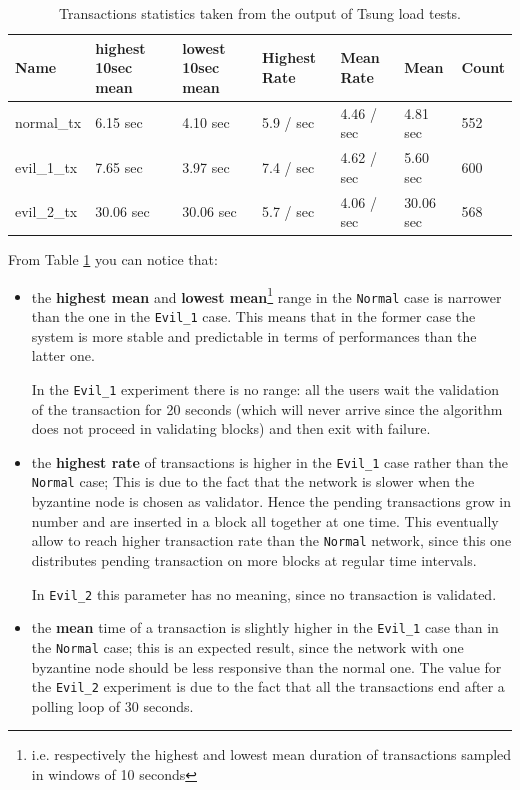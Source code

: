 \documentclass[]{article}
\begin{document}
\begin{table}[!htb]
\centering
\begin{tabular}{| l | l | l | l | l | l | l |}
	 \hline
	Name  & highest 10sec mean  & lowest 10sec mean & Highest Rate & Mean Rate & Mean  & Count \\
	 \hline
	 normal\_tx  & 6.15 sec & 4.10 sec & 5.9 / sec & 4.46 / sec & 4.81 sec & 552 \\	
	 \hline
	 evil\_1\_tx  & 7.65 sec & 3.97 sec & 7.4 / sec & 4.62 / sec & 5.60 sec & 600  \\
	 \hline
	 evil\_2\_tx  & 30.06 sec & 30.06 sec & 5.7 / sec & 4.06 / sec & 30.06 sec & 568  \\
	 \hline

\end{tabular}
\caption{\label{bench-main} Transactions statistics taken from the output of Tsung load tests.}
\end{table}
From Table \ref{bench-main} you can notice that:
\begin{itemize}
	\item the \textbf{highest mean} and \textbf{lowest mean}\footnote{i.e. respectively the highest and lowest mean duration of transactions sampled in windows of 10 seconds} range in the \texttt{Normal} case is narrower than the one in the \texttt{Evil\_1} case. This means that in the former case the system is more stable and predictable in terms of performances than the latter one.
	
	In the \texttt{Evil\_1} experiment there is no range: all the users wait the validation of the transaction for 20 seconds (which will never arrive since the algorithm does not proceed in validating blocks) and then exit with failure.
	\item the \textbf{highest rate} of transactions is higher in the \texttt{Evil\_1} case rather than the \texttt{Normal} case; This is due to the fact that the network is slower when the byzantine node is chosen as validator. Hence the pending transactions grow in number and are inserted in a block all together at one time. This eventually allow to reach higher transaction rate than the \texttt{Normal} network, since this one distributes pending transaction on more blocks at regular time intervals.
	
	In \texttt{Evil\_2} this parameter has no meaning, since no transaction is validated.
	
	\item the \textbf{mean} time of a transaction is slightly higher in the \texttt{Evil\_1} case than in the \texttt{Normal} case; this is an expected result, since the network with one byzantine node should be less responsive than the normal one.
	The value for the \texttt{Evil\_2} experiment is due to the fact that all the transactions end after a polling loop of 30 seconds.
\end{itemize}
\end{document}
